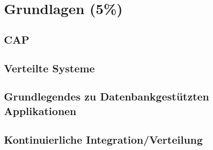 \chapter{Grundlagen (5\%)}
\section{CAP}
\section{Verteilte Systeme}
\section{Grundlegendes zu Datenbankgest\"utzten Applikationen}
\section{Kontinuierliche Integration/Verteilung}

